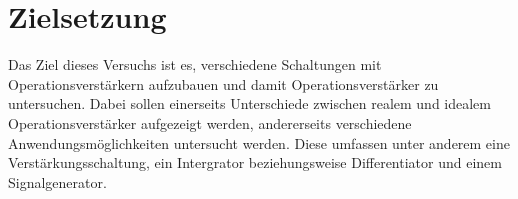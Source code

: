 \section{Zielsetzung}
Das Ziel dieses Versuchs ist es, verschiedene Schaltungen mit Operationsverstärkern aufzubauen und damit 
Operationsverstärker zu untersuchen. Dabei sollen einerseits Unterschiede zwischen realem und idealem Operationsverstärker
aufgezeigt werden, andererseits verschiedene Anwendungsmöglichkeiten untersucht werden. Diese umfassen unter anderem
eine Verstärkungsschaltung, ein Intergrator beziehungsweise Differentiator
und einem Signalgenerator.  